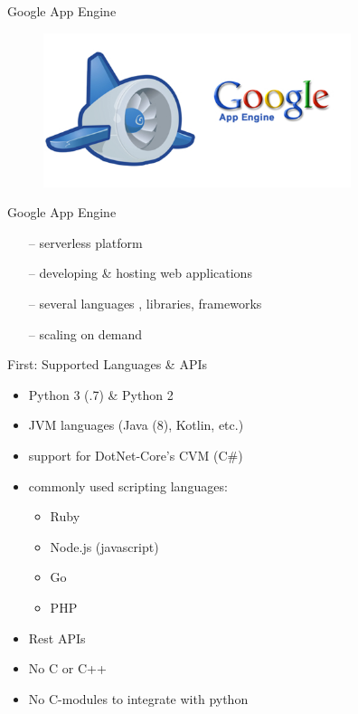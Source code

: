 \documentclass{beamer}
\begin{document}
\begin{frame}{Google App Engine}
	\begin{figure}[ht!]
		\centering
		\includegraphics[width=90mm]{google-app-engine-logo.jpg}
		
	\end{figure}
	
\end{frame}
\begin{frame}{Google App Engine  }
	\begin{itemize}
	\item[--] serverless platform 
	\item[--] developing \& hosting web applications
	\item[--] several languages , libraries, frameworks
	\item[--] scaling on demand
	\end{itemize}


\end{frame}
\begin{frame}{First: Supported Languages \& APIs}
	\begin{itemize}
		\item Python 3 (.7) \& Python 2
		\item JVM languages (Java (8), Kotlin, etc.)
		\item support for DotNet-Core's CVM (C\#)
	
		\item commonly used scripting languages:
		\begin{itemize}
		\item Ruby 
		\item Node.js (javascript)
		\item Go
		\item PHP

			\end{itemize}
		\item Rest APIs
		\item No C or C++
		\item No C-modules to integrate with python
	\end{itemize}
\end{frame}
\end{document}
